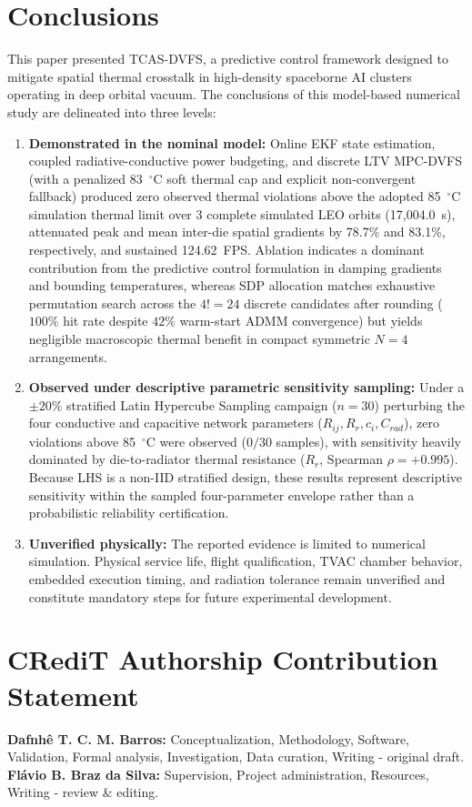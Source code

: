 \documentclass[a4paper,fleqn]{cas-dc}
\begin{document}
\section{Conclusions}
\label{sec:concl}
This paper presented TCAS-DVFS, a predictive control framework designed to mitigate spatial thermal crosstalk in high-density spaceborne AI clusters operating in deep orbital vacuum. The conclusions of this model-based numerical study are delineated into three levels:
\begin{enumerate}
\item \textbf{Demonstrated in the nominal model:} Online EKF state estimation, coupled radiative-conductive power budgeting, and discrete LTV MPC-DVFS (with a penalized 83~$^\circ$C soft thermal cap and explicit non-convergent fallback) produced zero observed thermal violations above the adopted 85~$^\circ$C simulation thermal limit over 3 complete simulated LEO orbits (17,004.0~s), attenuated peak and mean inter-die spatial gradients by 78.7\% and 83.1\%, respectively, and sustained 124.62~FPS. Ablation indicates a dominant contribution from the predictive control formulation in damping gradients and bounding temperatures, whereas SDP allocation matches exhaustive permutation search across the $4! = 24$ discrete candidates after rounding ($100\%$ hit rate despite $42\%$ warm-start ADMM convergence) but yields negligible macroscopic thermal benefit in compact symmetric $N=4$ arrangements.
\item \textbf{Observed under descriptive parametric sensitivity sampling:} Under a $\pm20\%$ stratified Latin Hypercube Sampling campaign ($n=30$) perturbing the four conductive and capacitive network parameters ($R_{ij}, R_r, c_i, C_{rad}$), zero violations above 85~$^\circ$C were observed ($0/30$ samples), with sensitivity heavily dominated by die-to-radiator thermal resistance ($R_r$, Spearman $\rho = +0.995$). Because LHS is a non-IID stratified design, these results represent descriptive sensitivity within the sampled four-parameter envelope rather than a probabilistic reliability certification.
\item \textbf{Unverified physically:} The reported evidence is limited to numerical simulation. Physical service life, flight qualification, TVAC chamber behavior, embedded execution timing, and radiation tolerance remain unverified and constitute mandatory steps for future experimental development.
\end{enumerate}

\section*{CRediT Authorship Contribution Statement}
\textbf{Dafnh\^e T. C. M. Barros:} Conceptualization, Methodology, Software, Validation, Formal analysis, Investigation, Data curation, Writing - original draft. \textbf{Fl\'avio B. Braz da Silva:} Supervision, Project administration, Resources, Writing - review \& editing.
\end{document}

